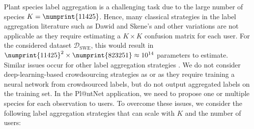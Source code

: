 Plant species label aggregation is a challenging task due to the large number of species $K=\numprint{11425}$.
Hence, many classical strategies in the label aggregation literature such as Dawid and Skene's \citep{dawid_maximum_1979} and other variations \citep{passonneau-carpenter-2014-benefits, sinha2018fast} are not applicable as they require estimating a $K\times K$ confusion matrix for each user.
For the considered dataset $\mathcal{D}_\text{SWE}$, this would result in $\numprint{11425}^2\times \numprint{823251}\approx 10^{14}$ parameters to estimate.
Similar issues occur for other label aggregation strategies \citep{whitehill_whose_2009,hovy2013learning,ma2020adversarial}.
We do not consider deep-learning-based crowdsourcing strategies as \citet{rodrigues2018deep,chu2021learning} or \citet{lefort2022improve} as they require training a neural network from crowdsourced labels, but do not output aggregated labels on the training set.
In the Pl@ntNet application, we need to propose one or multiple species for each observation to users.
To overcome these issues, we consider the following label aggregation strategies that can scale with $K$ and the number of users:
